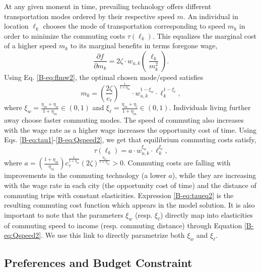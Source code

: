 \documentclass[11pt]{report}
\begin{document}
At any given moment in time, prevailing technology offers different transportation modes ordered by their respective speed $m$. An individual in location $\ell_k$ chooses the mode of transportation corresponding to speed $m_k$ in order to minimize the commuting costs $\tau(\ell_k)$. This equalizes the marginal cost of a higher speed $m_k$ to its marginal benefits in terms foregone wage,
\begin{equation*}
\frac{\partial f}{\partial m_k}=2\zeta \cdot w_{u,k}\left( \frac{\ell_k}{m_k^2}\right).
\end{equation*}
Using Eq. \ref{B-eq:flmw2}, the optimal chosen mode/speed satisfies
\begin{equation}
m_k=\left(  \frac{2\zeta}{c_\tau}\right)^{\frac{1}{1+\eta_m}}\cdot w_{u,k}^{1-\xi_w}\cdot\ell_k^{1-\xi_\ell}, \label{B-eq:Qspeed2}
\end{equation}
where $\xi_w=\frac{\eta_m+\eta_w}{1+\eta_m} \in (0,1)$ and $\xi_\ell=\frac{\eta_m+\eta_l}{1+\eta_m} \in (0,1)$. Individuals living further away choose faster commuting modes. The speed of commuting also increases with the wage rate as a higher wage increases the opportunity cost of time. 
Using Eqs. \ref{B-eq:tau1}-\ref{B-eq:Qspeed2}, we get that equilibrium commuting costs satisfy,
\begin{equation}
\tau(\ell_k)=a \cdot w_{u,k}^{\xi_w} \cdot \ell_k^{\xi_\ell}, \label{B-eq:taueq2}
\end{equation}
where $a=\left( \frac{1+\eta_m}{\eta_m}\right)  c_\tau^{\frac{1}{1+\eta_m}}\left( 2\zeta\right) ^{\frac{\eta_m}{1+\eta_m}}>0$. Commuting costs are falling with improvements in the commuting technology (a lower $a$), while they are increasing with the wage rate in each city (the opportunity cost of time) and the distance of commuting trips with constant elasticities. Expression \eqref{B-eq:taueq2} is the resulting commuting cost function which appears in the model solution. It is also important to note that the parameters $\xi_w$ (resp. $\xi_\ell$) directly map into elasticities of commuting speed to income (resp. commuting distance) through Equation \ref{B-eq:Qspeed2}. We use this link to directly parametrize both $\xi_w$ and $\xi_\ell$.

\subsection{Preferences and Budget Constraint}\label{B-sec:preferences} 
\end{document}
